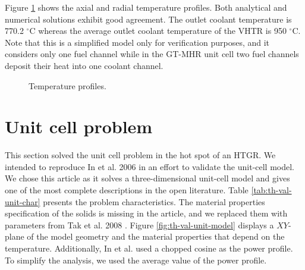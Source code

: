 Figure \ref{fig:th-ver-results} shows the axial and radial temperature profiles.
Both analytical and numerical solutions exhibit good agreement.
The outlet coolant temperature is 770.2 $^{\circ}$C whereas the average outlet coolant temperature of the VHTR is 950 $^{\circ}$C.
Note that this is a simplified model only for verification purposes, and it considers only one fuel channel while in the GT-MHR unit cell two fuel channels deposit their heat into one coolant channel.

\begin{figure}[htbp!]
	\centering
	\hfill
    \caption{Temperature profiles.}
	\label{fig:th-ver-results}
\end{figure}

\section{Unit cell problem}

This section solved the unit cell problem in the hot spot of an HTGR.
We intended to reproduce In et al. 2006 \cite{in_three-dimensional_2006} in an effort to validate the unit-cell model.
We chose this article as it solves a three-dimensional unit-cell model and gives one of the most complete descriptions in the open literature.
Table \ref{tab:th-val-unit-char} presents the problem characteristics.
The material properties specification of the solids is missing in the article, and we replaced them with parameters from Tak et al. 2008 \cite{tak_numerical_2008}.
Figure \ref{fig:th-val-unit-model} displays a $XY$-plane of the model geometry and the material properties that depend on the temperature.
Additionally, In et al. used a chopped cosine as the power profile.
To simplify the analysis, we used the average value of the power profile.

